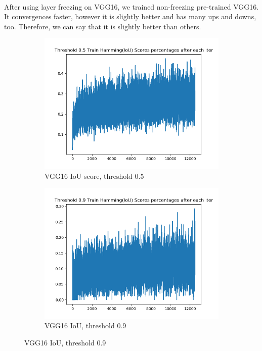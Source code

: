 \documentclass[12pt]{article}
\begin{document}
\paragraph{}After using layer freezing on VGG16, we trained non-freezing pre-trained VGG16. It convergences faster, however it is slightly better and has many ups and downs, too. Therefore, we can say that it is slightly better than others.

\begin{figure}[!ht]
\centering
\begin{subfigure}{.5\textwidth}
	\centering
	\includegraphics[width=1\linewidth]{vgg16-full-lazy-1-train-scores-hs-5.png}
	\caption{\label{vgg16:vgg16-full-lazy-1-train-scores-hs-5}VGG16 IoU score, threshold 0.5}
\end{subfigure}%
\begin{subfigure}{.5\textwidth}
	\centering
	\includegraphics[width=1\linewidth]{vgg16-full-lazy-1-train-scores-hs-9.png}
	\caption{\label{vgg16:vgg16-full-lazy-1-train-scores-hs-9}VGG16 IoU, threshold 0.9}
\end{subfigure}
\end{figure}
\end{document}
